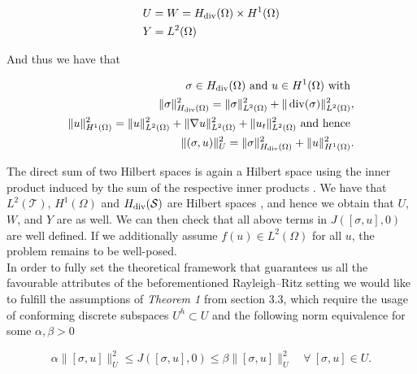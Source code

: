 \documentclass[../draft_1.tex]{subfiles}
\begin{document}
\begin{ceqn}
	\begin{align}
    & U = W = H_{\mathop{}\!\mathrm{div}}(\Omega) \times H^1(\Omega) \\
    & Y = L^2(\Omega)
	\end{align}
\end{ceqn}
 And thus we have that
\begin{ceqn}

	\begin{align}
	\label{spacesLS}
	\sigma \in H_{\mathop{}\!\mathrm{div}}(\Omega) \text{  and  } u \in H^1(\Omega) \text { with } \\
	\| \sigma \|_{H_{\mathop{}\!\mathrm{div}}(\Omega)}^2 = \| \sigma \|_{L^2(\Omega)}^2 + \| \mathop{}\!\mathrm{div}(\sigma) \|_{L^2(\Omega)}^2, \\
	 \|u \|_{H^1(\Omega)}^2 = \| u \|_{L^2(\Omega)}^2 + \| \nabla u \|_{L^2(\Omega)}^2 + \| u_t \|_{L^2(\Omega)}^2 \text{ and hence } \\
	 \| (\sigma, u) \|_U^2 = \| \sigma \|_{H_{\mathop{}\!\mathrm{div}}(\Omega)}^2 + \| u \|_{H^1(\Omega)}^2. \\
	\end{align}

\end{ceqn}
The direct sum of two Hilbert spaces is again a Hilbert space using the inner product induced by the sum of the respective inner products \cite{conway2013course}. We have that $L^2(\mathcal{T})$, $H^1(\Omega)$ and $H_{\mathop{}\!\mathrm{div}}(\mathcal{S})$ are Hilbert spaces \cite{tartar2007introduction}, and hence we obtain that $U$, $W$, and $Y$ are as well. We can then check that all above terms in $J([\sigma, u], 0)$ are well defined. If we additionally assume $f(u) \in L^2(\Omega)$ for all $u$, the problem remains to be well-posed. %
\smallskip
\\
In order to fully set the theoretical framework that guarantees us all the favourable attributes of the beforementioned Rayleigh--Ritz setting we would like to fulfill the assumptions of \textit{Theorem 1} from section 3.3, which require the usage of conforming discrete subspaces $U^h \subset U$ and the following norm equivalence for some $\alpha, \beta > 0$
\begin{ceqn}
	\begin{equation}
	\alpha \|[\sigma, u]\|_U^2 \leq J([\sigma, u], 0) \leq \beta \|[\sigma, u]\|_U^2  \quad \forall \  [\sigma, u] \in U.
	\end{equation}
\end{ceqn}
\end{document}
